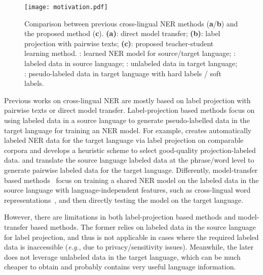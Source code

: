 \documentclass[11pt,a4paper]{article}
\newcommand\eg{\textit{e.g.}}
\begin{document}
	\begin{figure}[t]
		\centering
		\texttt{[image: motivation.pdf]}
		\caption{Comparison between previous cross-lingual NER methods (\textbf{a}/\textbf{b}) and the proposed method (\textbf{c}). \textbf{(a)}: direct model transfer; \textbf{(b)}: label projection with pairwise texts; \textbf{(c)}: proposed teacher-student learning method. 
			: learned NER model for source/target language; : labeled data in source language; : unlabeled data in target language; : pseudo-labeled data in target language with hard labels / soft labels. 
}
		\label{fig:motivation}
	\end{figure}
	
	Previous works on cross-lingual NER are mostly based on label projection with pairwise texts or direct model transfer. Label-projection based methods focus on using labeled data in a source language to generate pseudo-labelled data in the target language for training an NER model. 
	For example, \citet{ni2017weakly} creates automatically labeled NER data for the target language via label projection on comparable corpora and develops a heuristic scheme to select good-quality projection-labeled data.
	\citet{mayhew2017cheap} and \citet{xie2018neural} translate the source language labeled data at the phrase/word level to generate pairwise labeled data for the target language. Differently, model-transfer based methods~\cite{wu2019beto, wu2020enhanced} focus on training a shared NER model on the labeled data in the source language with language-independent features, such as cross-lingual word representations~\cite{devlin2019bert}, and then directly testing the model on the target language.


	However, there are limitations in both label-projection based methods and model-transfer based methods. 
	The former relies on labeled data in the source language for label projection, and thus is not applicable in cases where the required labeled data is inaccessible (\eg, due to privacy/sensitivity issues).  
Meanwhile, the later does not leverage unlabeled data in the target language, which can be much cheaper to obtain and probably contains very useful language information. 
\end{document}
